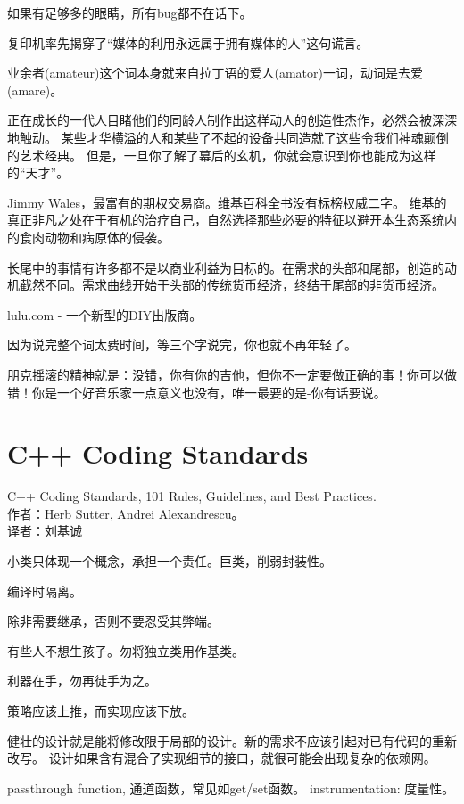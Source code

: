 如果有足够多的眼睛，所有bug都不在话下。

复印机率先揭穿了“媒体的利用永远属于拥有媒体的人”这句谎言。

业余者(amateur)这个词本身就来自拉丁语的爱人(amator)一词，动词是去爱(amare)。

正在成长的一代人目睹他们的同龄人制作出这样动人的创造性杰作，必然会被深深地触动。
某些才华横溢的人和某些了不起的设备共同造就了这些令我们神魂颠倒的艺术经典。
但是，一旦你了解了幕后的玄机，你就会意识到你也能成为这样的“天才”。

Jimmy Wales，最富有的期权交易商。维基百科全书没有标榜权威二字。
维基的真正非凡之处在于有机的治疗自己，自然选择那些必要的特征以避开本生态系统内的食肉动物和病原体的侵袭。

长尾中的事情有许多都不是以商业利益为目标的。在需求的头部和尾部，创造的动机截然不同。需求曲线开始于头部的传统货币经济，终结于尾部的非货币经济。

lulu.com - 一个新型的DIY出版商。

因为说完整个词太费时间，等三个字说完，你也就不再年轻了。

朋克摇滚的精神就是：没错，你有你的吉他，但你不一定要做正确的事！你可以做错！你是一个好音乐家一点意义也没有，唯一最要的是-你有话要说。

\section{C++ Coding Standards}
C++ Coding Standards, 101 Rules, Guidelines, and Best Practices.\\
作者：Herb Sutter, Andrei Alexandrescu。\\
译者：刘基诚


小类只体现一个概念，承担一个责任。巨类，削弱封装性。

编译时隔离。

除非需要继承，否则不要忍受其弊端。

有些人不想生孩子。勿将独立类用作基类。

利器在手，勿再徒手为之。

策略应该上推，而实现应该下放。

健壮的设计就是能将修改限于局部的设计。新的需求不应该引起对已有代码的重新改写。
设计如果含有混合了实现细节的接口，就很可能会出现复杂的依赖网。

passthrough function, 通道函数，常见如get/set函数。
instrumentation: 度量性。

